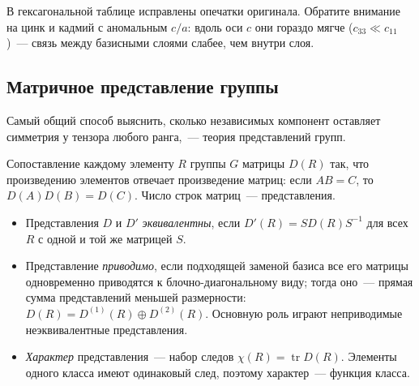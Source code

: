 \noindent В гексагональной таблице исправлены опечатки
оригинала.
Обратите внимание на цинк и кадмий с аномальным $c/a$: вдоль оси $c$ они
гораздо мягче ($c_{33}\ll c_{11}$)~— связь между базисными слоями слабее, чем
внутри слоя.

\subsection{Матричное представление группы}\label{ssec:representations}

Самый общий способ выяснить, сколько независимых компонент оставляет
симметрия у тензора любого ранга,~— теория представлений групп.

\begin{opredelenie}
Сопоставление каждому элементу $R$ группы $G$ матрицы $D(R)$ так, что
произведению элементов отвечает произведение матриц: если $AB=C$, то
$D(A)D(B)=D(C)$. Число строк матриц~—  представления.
\end{opredelenie}

\begin{itemize}
\item Представления $D$ и $D'$ \emph{эквивалентны}, если
$D'(R)=SD(R)S^{-1}$ для всех $R$ с одной и той же матрицей $S$.
\item Представление \emph{приводимо}, если подходящей заменой базиса все
его матрицы одновременно приводятся к блочно-диагональному виду; тогда
оно~— прямая сумма представлений меньшей размерности:
$D(R)=D^{(1)}(R)\oplus D^{(2)}(R)$. Основную роль играют неприводимые
неэквивалентные представления.
\item \emph{Характер} представления~— набор следов $\chi(R)=\operatorname{tr}D(R)$.
Элементы одного класса имеют одинаковый след, поэтому характер~—
функция класса.
\end{itemize}

